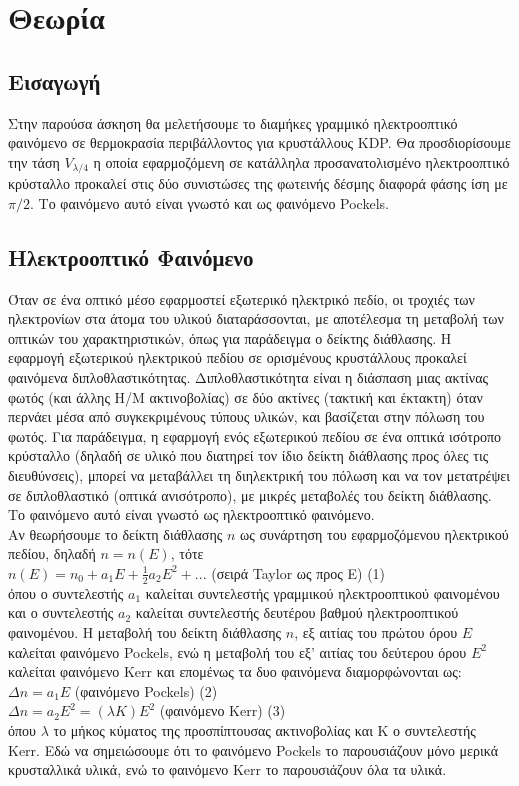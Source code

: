 \documentclass[a4paper,11pt,titlepage]{article}
\begin{document}
\section{Θεωρία}

\subsection{Εισαγωγή}

Στην παρούσα άσκηση θα μελετήσουμε το διαμήκες γραμμικό ηλεκτροοπτικό φαινόμενο σε θερμοκρασία περιβάλλοντος για κρυστάλλους KDP. Θα προσδιορίσουμε την τάση $V_{\lambda/4}$ η οποία εφαρμοζόμενη σε κατάλληλα προσανατολισμένο ηλεκτροοπτικό κρύσταλλο προκαλεί στις δύο συνιστώσες της φωτεινής δέσμης διαφορά φάσης ίση με $\pi /2$. Το φαινόμενο αυτό είναι γνωστό και ως φαινόμενο Pockels.

\subsection{Ηλεκτροοπτικό Φαινόμενο}

Όταν σε ένα οπτικό μέσο εφαρμοστεί εξωτερικό ηλεκτρικό πεδίο, οι τροχιές των ηλεκτρονίων στα άτομα του υλικού διαταράσσονται, με αποτέλεσμα τη μεταβολή των οπτικών του χαρακτηριστικών, όπως για παράδειγμα ο δείκτης διάθλασης. Η εφαρμογή εξωτερικού ηλεκτρικού πεδίου σε ορισμένους κρυστάλλους προκαλεί φαινόμενα διπλοθλαστικότητας. Διπλοθλαστικότητα είναι η διάσπαση μιας ακτίνας φωτός (και άλλης Η/Μ ακτινοβολίας) σε δύο ακτίνες (τακτική και έκτακτη) όταν περνάει μέσα από συγκεκριμένους τύπους υλικών, και βασίζεται στην πόλωση του φωτός. Για παράδειγμα, η εφαρμογή ενός εξωτερικού πεδίου σε ένα οπτικά ισότροπο κρύσταλλο (δηλαδή σε υλικό που διατηρεί τον ίδιο δείκτη διάθλασης προς όλες τις διευθύνσεις), μπορεί να μεταβάλλει τη διηλεκτρική του πόλωση και να τον μετατρέψει σε διπλοθλαστικό (οπτικά ανισότροπο), με μικρές μεταβολές του δείκτη διάθλασης. Το φαινόμενο αυτό είναι γνωστό ως ηλεκτροοπτικό φαινόμενο.\\
Αν θεωρήσουμε το δείκτη διάθλασης $n$ ως συνάρτηση του εφαρμοζόμενου ηλεκτρικού πεδίου, δηλαδή $n = n(E)$, τότε\\[7pt]
$n(E) = n_0 + a_1 E + \frac{1}{2} a_2 E^2 + ...$ (σειρά Taylor ως προς Ε) (1)\\[7pt]
όπου ο συντελεστής $a_1$ καλείται συντελεστής γραμμικού ηλεκτροοπτικού φαινομένου και ο συντελεστής $a_2$ καλείται συντελεστής δευτέρου βαθμού ηλεκτροοπτικού φαινομένου. Η μεταβολή του δείκτη διάθλασης $n$, εξ αιτίας του πρώτου όρου $E$ καλείται φαινόμενο Pockels, ενώ η μεταβολή του εξ' αιτίας του δεύτερου όρου $E^2$ καλείται φαινόμενο Kerr και επομένως τα δυο φαινόμενα διαμορφώνονται ως:\\[7pt]
$\Delta n = a_1 E $ (φαινόμενο Pockels) (2)\\[7pt]
$\Delta n = a_2 E^2 = (\lambda K) E^2 $ (φαινόμενο Kerr) (3) \\[7pt]
όπου $\lambda$ το μήκος κύματος της προσπίπτουσας ακτινοβολίας και Κ ο συντελεστής Kerr. Εδώ να σημειώσουμε ότι το φαινόμενο Pockels το παρουσιάζουν μόνο μερικά κρυσταλλικά υλικά, ενώ το φαινόμενο Kerr το παρουσιάζουν όλα τα υλικά.
\newpage
\end{document}
